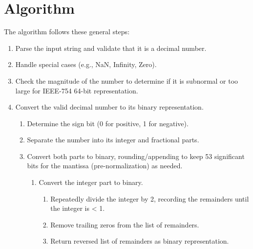 \documentclass[12pt]{article}
\begin{document}
\section*{Algorithm}
The algorithm follows these general steps:
\begin{enumerate}
    \item Parse the input string and validate that it is a decimal number.
    \item Handle special cases (e.g., NaN, Infinity, Zero).
    \item Check the magnitude of the number to determine if it is subnormal or too large for IEEE-754 64-bit representation.
    \item Convert the valid decimal number to its binary representation.
    \begin{enumerate}
        \item Determine the sign bit (0 for positive, 1 for negative).
        \item Separate the number into its integer and fractional parts.
        \item Convert both parts to binary, rounding/appending to keep 53 significant bits for the mantissa (pre-normalization) as needed.
        \begin{enumerate}
            \item Convert the integer part to binary.
            \begin{enumerate}
                \item Repeatedly divide the integer by 2, recording the remainders until the integer is < 1.
                \item Remove trailing zeros from the list of remainders.
                \item Return reversed list of remainders as binary representation.
                

\end{enumerate}
\end{enumerate}
\end{enumerate}
\end{enumerate}
\end{document}
